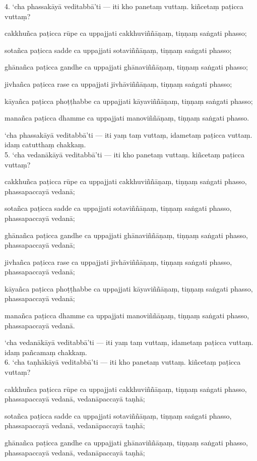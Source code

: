 \documentclass[10pt]{article}
\begin{document}
4. ‘cha phassakāyā veditabbā’ti — iti kho panetaṃ vuttaṃ. kiñcetaṃ paṭicca vuttaṃ?\

cakkhuñca paṭicca rūpe ca uppajjati cakkhuviññāṇaṃ, tiṇṇaṃ saṅgati phasso;\

sotañca paṭicca sadde ca uppajjati sotaviññāṇaṃ, tiṇṇaṃ saṅgati phasso;\

ghānañca paṭicca gandhe ca uppajjati ghānaviññāṇaṃ, tiṇṇaṃ saṅgati phasso;\

jivhañca paṭicca rase ca uppajjati jivhāviññāṇaṃ, tiṇṇaṃ saṅgati phasso;\

kāyañca paṭicca phoṭṭhabbe ca uppajjati kāyaviññāṇaṃ, tiṇṇaṃ saṅgati phasso;\

manañca paṭicca dhamme ca uppajjati manoviññāṇaṃ, tiṇṇaṃ saṅgati phasso.\

‘cha phassakāyā veditabbā’ti — iti yaṃ taṃ vuttaṃ, idametaṃ paṭicca vuttaṃ. idaṃ catutthaṃ chakkaṃ.\\

5. ‘cha vedanākāyā veditabbā’ti — iti kho panetaṃ vuttaṃ. kiñcetaṃ paṭicca vuttaṃ?\

cakkhuñca paṭicca rūpe ca uppajjati cakkhuviññāṇaṃ, tiṇṇaṃ saṅgati phasso, phassapaccayā vedanā;\

sotañca paṭicca sadde ca uppajjati sotaviññāṇaṃ, tiṇṇaṃ saṅgati phasso, phassapaccayā vedanā;\

ghānañca paṭicca gandhe ca uppajjati ghānaviññāṇaṃ, tiṇṇaṃ saṅgati phasso, phassapaccayā vedanā;\

jivhañca paṭicca rase ca uppajjati jivhāviññāṇaṃ, tiṇṇaṃ saṅgati phasso, phassapaccayā vedanā;\

kāyañca paṭicca phoṭṭhabbe ca uppajjati kāyaviññāṇaṃ, tiṇṇaṃ saṅgati phasso, phassapaccayā vedanā;\

manañca paṭicca dhamme ca uppajjati manoviññāṇaṃ, tiṇṇaṃ saṅgati phasso, phassapaccayā vedanā.\

‘cha vedanākāyā veditabbā’ti — iti yaṃ taṃ vuttaṃ, idametaṃ paṭicca vuttaṃ. idaṃ pañcamaṃ chakkaṃ.\\

6. ‘cha taṇhākāyā veditabbā’ti — iti kho panetaṃ vuttaṃ. kiñcetaṃ paṭicca vuttaṃ?\

cakkhuñca paṭicca rūpe ca uppajjati cakkhuviññāṇaṃ, tiṇṇaṃ saṅgati phasso, phassapaccayā vedanā, vedanāpaccayā taṇhā;\

sotañca paṭicca sadde ca uppajjati sotaviññāṇaṃ, tiṇṇaṃ saṅgati phasso, phassapaccayā vedanā, vedanāpaccayā taṇhā;\

ghānañca paṭicca gandhe ca uppajjati ghānaviññāṇaṃ, tiṇṇaṃ saṅgati phasso, phassapaccayā vedanā, vedanāpaccayā taṇhā;\
\end{document}
